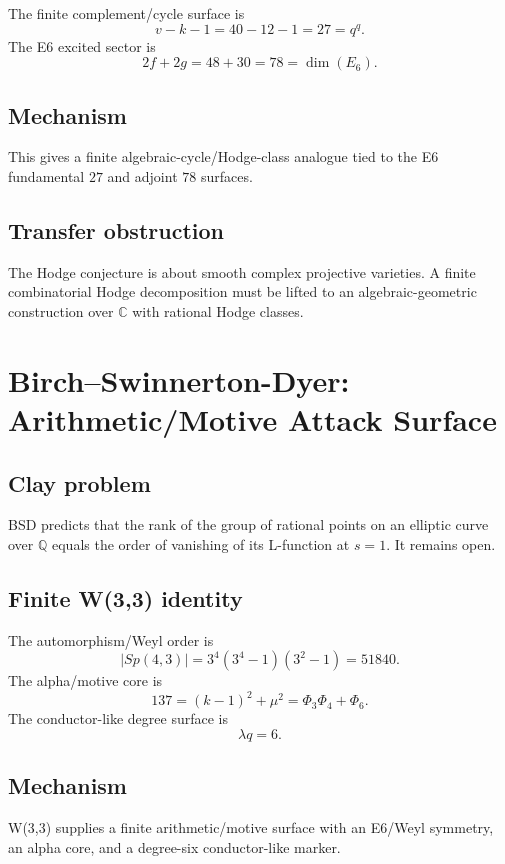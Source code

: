\documentclass[11pt]{article}
\theoremstyle{definition}
\newcommand{\C}{\mathbb{C}}
\newcommand{\Q}{\mathbb{Q}}
\newcommand{\PhiThree}{\Phi_3}
\newcommand{\PhiFour}{\Phi_4}
\newcommand{\PhiSix}{\Phi_6}
\begin{document}
The finite complement/cycle surface is
\[
  v-k-1=40-12-1=27=q^q.
\]
The E6 excited sector is
\[
  2f+2g=48+30=78=\dim(E_6).
\]

\subsection{Mechanism}

This gives a finite algebraic-cycle/Hodge-class analogue tied to the E6 fundamental \(27\) and adjoint \(78\) surfaces.

\subsection{Transfer obstruction}

The Hodge conjecture is about smooth complex projective varieties.  A finite combinatorial Hodge decomposition must be lifted to an algebraic-geometric construction over \(\C\) with rational Hodge classes.

\section{Birch--Swinnerton-Dyer: Arithmetic/Motive Attack Surface}

\subsection{Clay problem}

BSD predicts that the rank of the group of rational points on an elliptic curve over \(\Q\) equals the order of vanishing of its L-function at \(s=1\).  It remains open.

\subsection{Finite W(3,3) identity}

The automorphism/Weyl order is
\[
  |Sp(4,3)|=3^4(3^4-1)(3^2-1)=51840.
\]
The alpha/motive core is
\[
  137=(k-1)^2+\mu^2=\PhiThree\PhiFour+\PhiSix.
\]
The conductor-like degree surface is
\[
  \lambda q=6.
\]

\subsection{Mechanism}

W(3,3) supplies a finite arithmetic/motive surface with an E6/Weyl symmetry, an alpha core, and a degree-six conductor-like marker.
\end{document}
